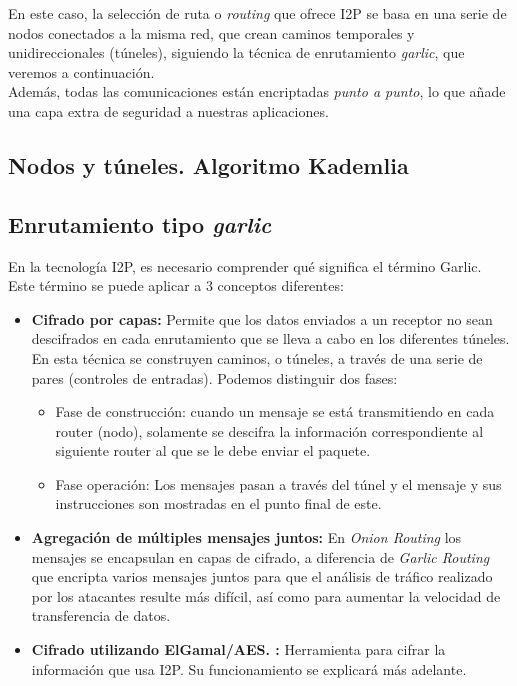 En este caso, la selección de ruta o \textit{routing} que ofrece I2P se basa en una serie de nodos conectados a la misma red, que crean caminos temporales y unidireccionales (túneles), siguiendo la técnica de enrutamiento \textit{garlic}, que veremos a continuación.\\

Además, todas las comunicaciones están encriptadas \textit{punto a punto}, lo que añade una capa extra de seguridad a nuestras aplicaciones.

\subsection{Nodos y túneles. Algoritmo Kademlia}






\subsection{Enrutamiento tipo \textit{garlic}}

En la tecnología I2P, es necesario comprender qué significa el término Garlic. Este término se puede aplicar a 3 conceptos diferentes:

\begin{itemize}
\item \textbf{Cifrado por capas:}
Permite que los datos enviados a un receptor no sean descifrados en cada enrutamiento que se lleva a cabo en los diferentes túneles. 
En esta técnica se construyen caminos, o túneles, a través de una serie de pares (controles de entradas). Podemos distinguir dos fases:


\begin{itemize}
	\item Fase de construcción: cuando un mensaje se está transmitiendo en cada router (nodo), solamente se descifra la información correspondiente al siguiente router al que se le debe enviar el paquete.
	\item 
	Fase  operación: Los mensajes pasan a través del túnel y el mensaje y sus instrucciones son mostradas en el punto final de este.
	
	
\end{itemize}	




\item \textbf{Agregación de múltiples mensajes juntos:}
En \textit{Onion Routing} los mensajes se encapsulan en capas de cifrado, a diferencia de \textit{Garlic Routing} que encripta varios mensajes juntos para que el análisis de tráfico realizado por los atacantes resulte más difícil, así como para aumentar la velocidad de transferencia de datos.


\item \textbf{Cifrado utilizando ElGamal/AES. :}
Herramienta para cifrar la información que usa I2P. Su funcionamiento se explicará más adelante.


\end{itemize}




